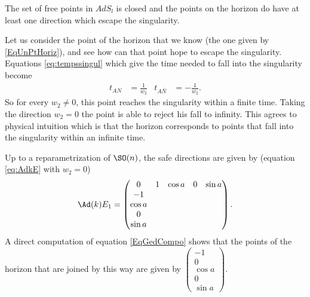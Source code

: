 \begin{corollary}		\label{CorTNFermeHorEchape}
	The set of free points in $AdS_l$ is closed and the points on the horizon do have at least one direction which escape the singularity.
\end{corollary}

Let us consider the point of the horizon that we know (the one given by \eqref{EqUnPtHoriz}), and see how can that point hope to escape the singularity.  Equations \eqref{eq:tempssingul} which give the time needed to fall into the singularity become
\begin{align}
	t_{AN} & =\frac{1}{w_{2}} & t_{A \bar{N}} & =-\frac{1}{w_{2}}.
\end{align}
So for every $w_{2}\neq 0$, this point reaches the singularity within a finite time. Taking the direction $w_{2}=0$ the point is able to reject his fall to infinity. This agrees to physical intuition which is that the horizon corresponds to points that fall into the singularity within an infinite time.

Up to a reparametrization of $\SO(n)$, the safe directions are given by (equation \eqref{eq:AdkE} with $w_2=0$)
\[
	\Ad(k)E_1=
	\begin{pmatrix}
		0 & 1 & \cos a & 0 & \sin a \\
		-1                          \\
		\cos a                      \\
		0                           \\
		\sin a
	\end{pmatrix}.
\]
A direct  computation of equation \eqref{EqGedCompo}  shows that the points of the horizon that are joined by this way are given by
$
	\begin{pmatrix}
		-1     \\
		0      \\
		\cos a \\
		0      \\
		\sin a
	\end{pmatrix}.
$
